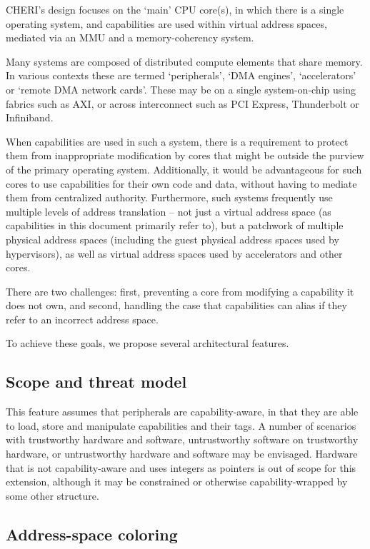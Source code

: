 CHERI's design focuses on the `main' CPU core(s), in which there is a single operating system, and capabilities are used within virtual address spaces, mediated via an MMU and a memory-coherency system.

Many systems are composed of distributed compute elements that share memory.  In various contexts these are termed `peripherals', `DMA engines', `accelerators' or `remote DMA network cards'.  These may be on a single system-on-chip using fabrics such as AXI, or across interconnect such as PCI Express, Thunderbolt or Infiniband.

When capabilities are used in such a system, there is a requirement to
protect them from inappropriate modification by cores that might be outside the purview of the primary operating system.  Additionally, it would be advantageous for such cores to use capabilities for their own code and data, without having to mediate them from centralized authority.  Furthermore, such systems frequently use multiple levels of address translation -- not just a virtual address space (as capabilities in this document primarily refer to), but a patchwork of multiple physical address spaces (including the guest physical address spaces used by hypervisors), as well as virtual address spaces used by accelerators and other cores.

There are two challenges: first, preventing a core from modifying a
capability it does not own, and second, handling the case that capabilities
can alias if they refer to an incorrect address space.

To achieve these goals, we propose several architectural features.

\subsection{Scope and threat model}
This feature assumes that peripherals are capability-aware, in that they are able to load, store and manipulate capabilities and their tags.  A number of scenarios with trustworthy hardware and software, untrustworthy software on trustworthy hardware, or untrustworthy hardware and software may be envisaged.  Hardware that is not capability-aware and uses integers as pointers is out of scope for this extension, although it may be constrained or otherwise capability-wrapped by some other structure.

\subsection{Address-space coloring}

